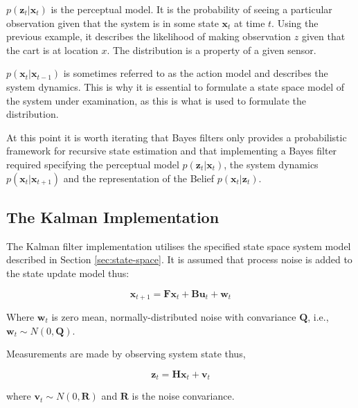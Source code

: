 \begin{compactitem}
\item
$p(\mathbf{z}_{t} | \mathbf{x}_{t})$ is the perceptual model. It is the probability
of seeing a particular observation given that the system is in some state
$\mathbf{x}_{t}$ at time $t$. Using the previous example, it describes the
likelihood of making observation $z$ given that the cart is at location $x$.
The distribution is a property of a given sensor. \\
\item
$p(\mathbf{x}_{t} | \mathbf{x}_{t-1})$ is sometimes referred to as the action
model and describes the system dynamics. This is why it is essential to formulate
a state space model of the system under examination, as this is what is used to
formulate the distribution.
\end{compactitem}

At this point it is worth iterating that Bayes filters only provides a
probabilistic framework for recursive state estimation and that implementing
a Bayes filter required specifying the perceptual model
$p(\mathbf{z}_{t} | \mathbf{x}_{t})$, the system dynamics
$p(\mathbf{x}_{t} | \mathbf{x}_{t+1})$ and the representation of the Belief
$p(\mathbf{x}_{t} | \mathbf{z}_{t})$.

\subsection{The Kalman Implementation}
The Kalman filter implementation utilises the specified state space system
model described in Section \ref{sec:state-space}. It is assumed that process noise
is added to the state update model thus:

\begin{equation}
\mathbf{x}_{t+1} = \mathbf{Fx}_{t} + \mathbf{Bu}_{t} + \mathbf{w}_t
\end{equation}

Where $\mathbf{w}_t$ is zero mean, normally-distributed noise with convariance
$\mathbf{Q}$, i.e., $\mathbf{w}_{t} \sim N(0, \mathbf{Q})$.

Measurements are made by observing system state thus,

\begin{equation}
\mathbf{z}_{t} = \mathbf{Hx}_{t} + \mathbf{v}_t
\end{equation}

where $\mathbf{v}_{t} \sim N(0, \mathbf{R})$ and $\mathbf{R}$ is the
noise convariance.

